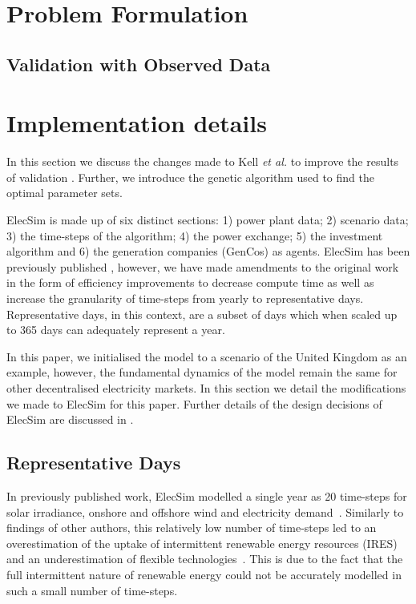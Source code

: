 \section{Problem Formulation}
\label{ssec:prob_formulation}





\subsection{Validation with Observed Data}
\label{sssec:validation}


\section{Implementation details}
\label{sec:details}

In this section we discuss the changes made to Kell \textit{et al.} to improve the results of validation \cite{Kell}. Further, we introduce the genetic algorithm used to find the optimal parameter sets.


ElecSim is made up of six distinct sections: 1) power plant data; 2) scenario data; 3) the time-steps of the algorithm; 4) the power exchange; 5) the investment algorithm and 6) the generation companies (GenCos) as agents. ElecSim has been previously published \cite{Kell}, however, we have made amendments to the original work in the form of  efficiency improvements to decrease compute time as well as increase the granularity of time-steps from yearly to representative days.  Representative days, in this context, are a subset of days which when scaled up to 365 days can adequately represent a year. 

In this paper, we initialised the model to a scenario of the United Kingdom as an example, however, the fundamental dynamics of the model remain the same for other decentralised electricity markets. In this section we detail the modifications we made to ElecSim for this paper. Further details of the design decisions of ElecSim are discussed in \cite{Kell}.


\subsection{Representative Days}
\label{ssec:representative_days}

In previously published work, ElecSim modelled a single year as 20 time-steps for solar irradiance, onshore and offshore wind and electricity demand~\cite{Kell}. Similarly to findings of other authors, this relatively low number of time-steps led to an overestimation of the uptake of intermittent renewable energy resources (IRES) and an underestimation of flexible technologies~\cite{Ludig2011,Haydt2011}. This is due to the fact that the full intermittent nature of renewable energy could not be accurately modelled in such a small number of time-steps.

